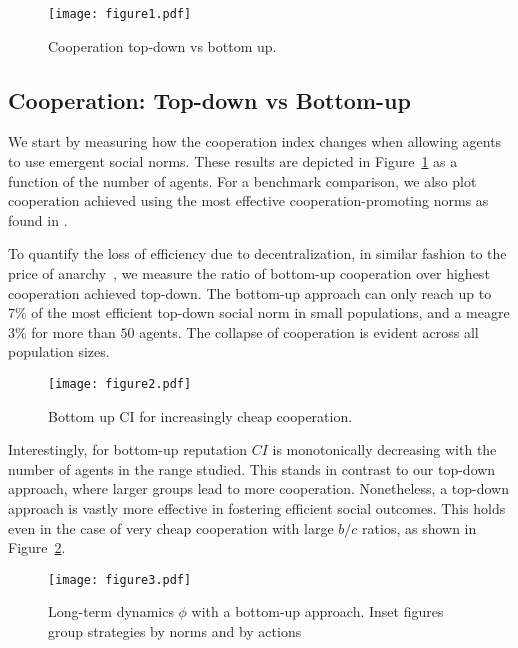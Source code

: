 \documentclass[sigconf]{aamas}  %
\begin{document}
\begin{figure}
\texttt{[image: figure1.pdf]}
\caption{Cooperation top-down vs bottom up. \label{fig1}}
\end{figure}



\subsection{Cooperation: Top-down vs Bottom-up}

We start by measuring how the cooperation index changes when allowing agents to use emergent social norms. These results are depicted in Figure~\ref{fig1} as a function of the number of agents. For a benchmark comparison, we also plot cooperation achieved using the most effective cooperation-promoting norms as found in \cite{Santos2016}. 





To quantify the loss of efficiency due to decentralization, in similar fashion to the price of anarchy~\cite{nisan2007algorithmic}, we measure the ratio of bottom-up cooperation over highest cooperation achieved top-down. The bottom-up approach can only reach up to $7 \%$ of the most efficient top-down social norm in small populations, and a meagre $3\%$ for more than $50$ agents. The collapse of cooperation is evident across all population sizes. 


\begin{figure}
\texttt{[image: figure2.pdf]}
\caption{Bottom up CI for increasingly cheap cooperation.\label{fig2}}
\end{figure}


Interestingly, for bottom-up reputation $CI$ is monotonically decreasing with the number of agents in the range studied. This stands in contrast to our top-down approach, where larger groups lead to more cooperation. Nonetheless, a top-down approach is vastly more effective in fostering efficient social outcomes. This holds even in the case of very cheap cooperation with large $b/c$ ratios, as shown in Figure~\ref{fig2}.





\begin{figure*}
\texttt{[image: figure3.pdf]}
\caption{Long-term dynamics $\phi$ with a bottom-up approach. Inset figures group strategies by norms and by actions \label{fig:stationary}}
\end{figure*}
\end{document}
